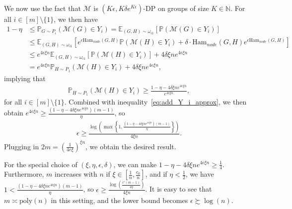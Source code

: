 \documentclass{article}
\begin{document}
We now use the fact that $\mathcal{M}$ is  $(K\epsilon, K\delta e^{K\epsilon})$-DP on groups of size $K \in \mathbb{N}$. For all $i \in [m]\setminus \{1\}$, we then have
\begin{align*}
1 - \eta &\leq \mathbb{P}_{G \sim P_i}(\mathcal{M}(G) \in Y_i) = \mathbb{E}_{(G, H) \sim \omega_{i1}}\left[\mathbb{P}(\mathcal{M}(G) \in Y_i)\right]\\
&\leq \mathbb{E}_{(G, H) \sim \omega_{i1}}\left[e^{\epsilon\text{Ham}_{node}(G, H)}\mathbb{P}(\mathcal{M}(H) \in Y_i) + \delta \cdot \text{Ham}_{node}(G, H)e^{\epsilon\text{Ham}_{node}(G, H)}\right]\\
&\leq e^{4\epsilon\xi n}\mathbb{E}_{(G, H) \sim \omega_{i1}}\left[\mathbb{P}(\mathcal{M}(H) \in Y_i)\right] + 4\delta\xi n e^{4\epsilon\xi n} \\
%
& = e^{4\epsilon\xi n}\mathbb{P}_{H \sim P_1}(\mathcal{M}(H) \in Y_i) + 4\delta\xi n e^{4\epsilon\xi n},
\end{align*}
implying that
\begin{align*}
\mathbb{P}_{H \sim P_1}(\mathcal{M}(H) \in Y_i) \geq \frac{1 - \eta - 4\delta\xi n e^{4\epsilon\xi n}}{e^{4\epsilon\xi n}},
\end{align*}
for all $i \in [m]\setminus \{1\}$. Combined with inequality~\eqref{eq:add_Y_i_approx}, we then obtain $e^{4\epsilon\xi n} \geq \frac{(1 - \eta - 4\delta\xi n e^{4\epsilon\xi n})(m - 1)}{\eta}$, so
\begin{align*}
\epsilon \geq \frac{\log\left(\max\left\{1, \frac{(1 - \eta - 4\delta\xi n e^{4\epsilon\xi n})(m - 1)}{\eta}\right\}\right)}{4\xi n}.   
\end{align*}
Plugging in $2m = \left(\frac{1}{4e\xi}\right)^{\xi n}$, we obtain the desired result.

For the special choice of $(\xi, \eta, \epsilon, \delta)$, we can make $1 - \eta - 4\delta\xi n e^{4\epsilon\xi n} \ge \frac{1}{4}$.
Furthermore, $m$ increases with $n$ if $\xi \in \left[\frac{1}{n}, \frac{c_0}{n}\right]$, and if $\eta < \frac{1}{2}$, we have $1 < \frac{(1 - \eta - 4\delta\xi n e^{4\epsilon\xi n})(m - 1)}{\eta}$, so $\epsilon \geq \frac{\log\left(\frac{c'(m - 1)}{4\eta}\right)}{4\xi n}$. It is easy to see that $m \asymp \mathrm{poly}(n)$ in this setting, and the lower bound becomes $\epsilon \succsim \log(n)$.
\end{document}
